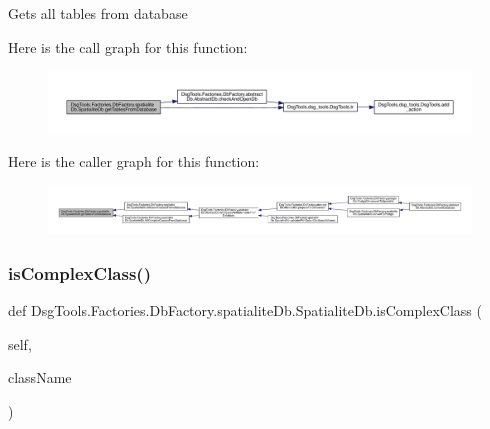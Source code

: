\begin{DoxyVerb}Gets all tables from database
\end{DoxyVerb}
 Here is the call graph for this function\+:
\nopagebreak
\begin{figure}[H]
\begin{center}
\leavevmode
\includegraphics[width=350pt]{class_dsg_tools_1_1_factories_1_1_db_factory_1_1spatialite_db_1_1_spatialite_db_aaae60033f57202171d14f0c266b5fe36_cgraph}
\end{center}
\end{figure}
Here is the caller graph for this function\+:
\nopagebreak
\begin{figure}[H]
\begin{center}
\leavevmode
\includegraphics[width=350pt]{class_dsg_tools_1_1_factories_1_1_db_factory_1_1spatialite_db_1_1_spatialite_db_aaae60033f57202171d14f0c266b5fe36_icgraph}
\end{center}
\end{figure}
\mbox{\label{class_dsg_tools_1_1_factories_1_1_db_factory_1_1spatialite_db_1_1_spatialite_db_a410353e9f2234473f8888a4306d2d141}} 
\subsubsection{\texorpdfstring{is\+Complex\+Class()}{isComplexClass()}}
{\footnotesize\ttfamily def Dsg\+Tools.\+Factories.\+Db\+Factory.\+spatialite\+Db.\+Spatialite\+Db.\+is\+Complex\+Class (\begin{DoxyParamCaption}\item[{}]{self,  }\item[{}]{class\+Name }\end{DoxyParamCaption})}

